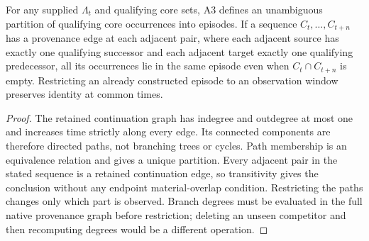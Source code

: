 \begin{proposition}\label{prop:lineage}
For any supplied $\Lambda_t$ and qualifying core sets, A3 defines an unambiguous partition of qualifying core occurrences into episodes. If a sequence $C_t,\ldots,C_{t+n}$ has a provenance edge at each adjacent pair, where each adjacent source has exactly one qualifying successor and each adjacent target exactly one qualifying predecessor, all its occurrences lie in the same episode even when $C_t\cap C_{t+n}$ is empty. Restricting an already constructed episode to an observation window preserves identity at common times.
\end{proposition}
\begin{proof}
The retained continuation graph has indegree and outdegree at most one and increases time strictly along every edge. Its connected components are therefore directed paths, not branching trees or cycles. Path membership is an equivalence relation and gives a unique partition. Every adjacent pair in the stated sequence is a retained continuation edge, so transitivity gives the conclusion without any endpoint material-overlap condition. Restricting the paths changes only which part is observed. Branch degrees must be evaluated in the full native provenance graph before restriction; deleting an unseen competitor and then recomputing degrees would be a different operation.
\end{proof}

